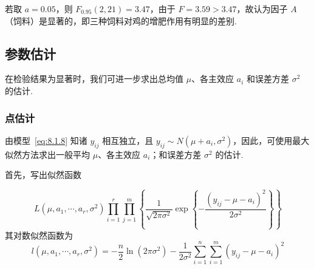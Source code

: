 若取 $a=0.05$，则 $F_{0.95} (2, 21)=3.47$，由于 $F=3.59>3.47$，故认为因子 $A$（饲料）是显著的，即三种饲料对鸡的增肥作用有明显的差别.

\subsection{参数估计}

在检验结果为显著时，我们可进一步求出总均值 $\mu$、各主效应 $a_i$ 和误差方差 $\sigma^2$ 的估计.

\subsubsection{点估计}

由模型~\eqref{eq:8.1.8} 知诸 $y_{ij}$ 相互独立，且 $y_{ij}\sim N(\mu+a_i,\sigma^2)$，因此，可使用最大似然方法求出一般平均 $\mu$、各主效应 $a_i$；和误差方差 $\sigma^2$ 的估计.

首先，写出似然函数

\begin{equation*}
  L\left(\mu, a_{1}, \cdots, a_{r}, \sigma^{2}\right) \prod_{i=1}^{r} \prod_{j=1}^{m}\left\{\frac{1}{\sqrt{2 \pi \sigma^{2}}} \exp \left\{-\frac{\left(y_{i j}-\mu-a_{i}\right)^{2}}{2 \sigma^{2}}\right\}\right\}
\end{equation*}
其对数似然函数为
\begin{equation*}
  l\left(\mu, a_{1}, \cdots, a_{r}, \sigma^{2}\right)=-\frac{n}{2} \ln \left(2 \pi \sigma^{2}\right)-\frac{1}{2 \sigma^{2}} \sum_{i=1}^{n} \sum_{i=1}^{m}\left(y_{i j}-\mu-a_{i}\right)^{2}
\end{equation*}


